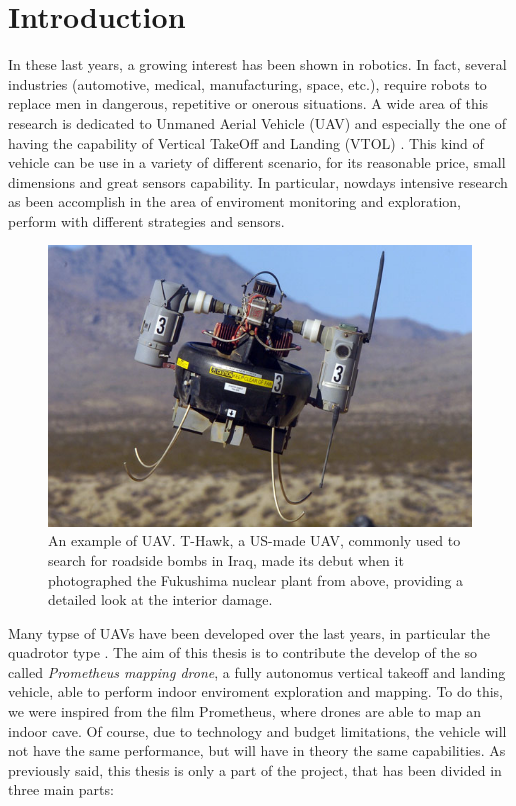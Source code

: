 \chapter{Introduction}
\label{introduction}

\renewcommand{\thepage}{\arabic{page}} 			%
\setcounter{page}{1}                   			%

In these last years, a growing interest has been shown in robotics. In fact, several industries (automotive, medical, manufacturing, space, etc.), require robots to replace men in dangerous, repetitive or onerous situations. A wide area of this research is dedicated to Unmaned Aerial Vehicle (UAV) and especially the one of having the capability of Vertical TakeOff and Landing (VTOL) \cite{largeQuadrotor}. This kind of vehicle can be use in a variety of different scenario, for its reasonable price, small dimensions and great sensors capability. In particular, nowdays intensive research as been accomplish in the area of enviroment monitoring and exploration, perform with different strategies and sensors.

\begin{figure}
	\includegraphics[scale=0.4]{images/fukushima.jpg}
	\caption{An example of UAV. T-Hawk, a US-made UAV, commonly used to search for roadside bombs in Iraq, made its debut when it photographed the Fukushima nuclear plant from above, providing a detailed look at the interior damage.}
	\label{fig:application}
\end{figure}  

\noindent Many typse of UAVs have been developed over the last years, in particular the quadrotor type \cite{Aalborg}. The aim of this thesis is to contribute the develop of the so called \textit{Prometheus mapping drone}, a fully autonomus vertical takeoff and landing vehicle, able to perform indoor enviroment exploration and mapping. To do this, we were inspired from the film Prometheus, where drones are able to map an indoor cave. Of course, due to technology and budget limitations, the vehicle will not have the same performance, but will have in theory the same capabilities. As previously said, this thesis is only a part of the project, that has been divided in three main parts:

